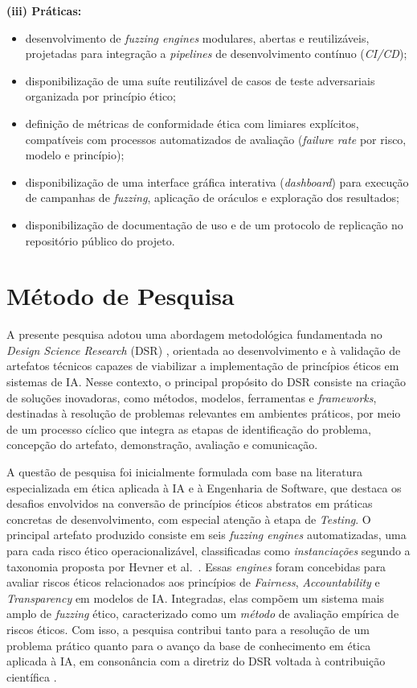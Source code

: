\textbf{(iii) Práticas:}
\begin{itemize}
    \item desenvolvimento de \textit{fuzzing engines} modulares, abertas e reutilizáveis, projetadas para integração a \textit{pipelines} de desenvolvimento contínuo (\textit{CI/CD});
    \item disponibilização de uma suíte reutilizável de casos de teste adversariais organizada por princípio ético;
    \item definição de métricas de conformidade ética com limiares explícitos, compatíveis com processos automatizados de avaliação (\textit{failure rate} por risco, modelo e princípio);
    \item disponibilização de uma interface gráfica interativa (\textit{dashboard}) para execução de campanhas de \textit{fuzzing}, aplicação de oráculos e exploração dos resultados;
    \item disponibilização de documentação de uso e de um protocolo de replicação no repositório público do projeto.
\end{itemize}

\section{Método de Pesquisa}
\label{sec:metodo}

A presente pesquisa adotou uma abordagem metodológica fundamentada no \textit{Design Science Research} (DSR) \cite{Hevner2004, Wieringa2014, Peffers2007}, orientada ao desenvolvimento e à validação de artefatos técnicos capazes de viabilizar a implementação de princípios éticos em sistemas de IA. Nesse contexto, o principal propósito do DSR consiste na criação de soluções inovadoras, como métodos, modelos, ferramentas e \textit{frameworks}, destinadas à resolução de problemas relevantes em ambientes práticos, por meio de um processo cíclico que integra as etapas de identificação do problema, concepção do artefato, demonstração, avaliação e comunicação.

A questão de pesquisa foi inicialmente formulada com base na literatura especializada em ética aplicada à IA e à Engenharia de Software, que destaca os desafios envolvidos na conversão de princípios éticos abstratos em práticas concretas de desenvolvimento, com especial atenção à etapa de \textit{Testing}. O principal artefato produzido consiste em seis \textit{fuzzing engines} automatizadas, uma para cada risco ético operacionalizável, classificadas como \textit{instanciações} segundo a taxonomia proposta por Hevner et al.~\cite{Hevner2004}. Essas \textit{engines} foram concebidas para avaliar riscos éticos relacionados aos princípios de \textit{Fairness}, \textit{Accountability} e \textit{Transparency} em modelos de IA. Integradas, elas compõem um sistema mais amplo de \textit{fuzzing} ético, caracterizado como um \textit{método} de avaliação empírica de riscos éticos. Com isso, a pesquisa contribui tanto para a resolução de um problema prático quanto para o avanço da base de conhecimento em ética aplicada à IA, em consonância com a diretriz do DSR voltada à contribuição científica \cite{Hevner2004}.

